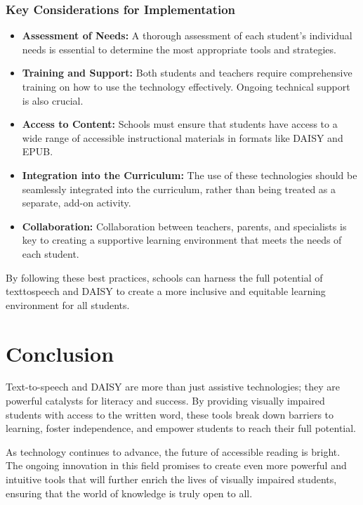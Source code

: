 \subsubsection{Key Considerations for Implementation}

\begin{itemize}
	\item \textbf{Assessment of Needs:} A thorough assessment of each student's individual needs is essential to determine the most appropriate tools and strategies.
	\item \textbf{Training and Support:} Both students and teachers require comprehensive training on how to use the technology effectively. Ongoing technical support is also crucial.
	\item \textbf{Access to Content:} Schools must ensure that students have access to a wide range of accessible instructional materials in formats like DAISY and EPUB.
	\item \textbf{Integration into the Curriculum:} The use of these technologies should be seamlessly integrated into the curriculum, rather than being treated as a separate, add-on activity.
	\item \textbf{Collaboration:} Collaboration between teachers, parents, and specialists is key to creating a supportive learning environment that meets the needs of each student.
\end{itemize}

By following these best practices, schools can harness the full potential of \gls{texttospeech} and DAISY to create a more inclusive and equitable learning environment for all students.

\section{Conclusion}

Text-to-speech and DAISY are more than just assistive technologies; they are powerful catalysts for literacy and success. By providing visually impaired students with access to the written word, these tools break down barriers to learning, foster independence, and empower students to reach their full potential.\supercite{StudentOutcomesResearch, wjaets2024}

As \gls{technology} continues to advance, the future of accessible reading is bright. The ongoing innovation in this field promises to create even more powerful and intuitive tools that will further enrich the lives of visually impaired students, ensuring that the world of knowledge is truly open to all.\supercite{maitraye2024, arxiv2503}
